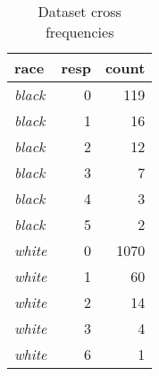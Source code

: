 \begin{table}[H]

\caption{\label{tab:dataset_crosscount}Dataset cross frequencies}
\centering
\begin{tabular}[t]{>{}l|r|r}
\hline
race & resp & count\\
\hline
\hline
\em{black} & 0 & 119\\
\hline
\em{black} & 1 & 16\\
\hline
\em{black} & 2 & 12\\
\hline
\em{black} & 3 & 7\\
\hline
\em{black} & 4 & 3\\
\hline
\em{black} & 5 & 2\\
\hline
\em{white} & 0 & 1070\\
\hline
\em{white} & 1 & 60\\
\hline
\em{white} & 2 & 14\\
\hline
\em{white} & 3 & 4\\
\hline
\em{white} & 6 & 1\\
\hline
\end{tabular}
\end{table}